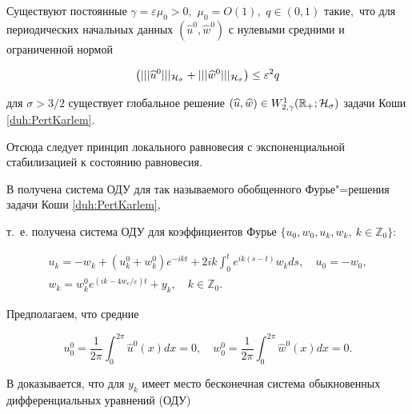 \begin{theorem}[1]\label{duh:0}Существуют постоянные $\gamma=\varepsilon \mu_0>0,$ $\mu_0=O{(1)},$ $q\in(0,1)$ такие$,$ что для периодических начальных данных $(\widehat{u}^0, \widehat{w}^0)$ с нулевыми средними и ограниченной нормой

\begin{equation}

\bigl(|||\widehat{u}^0|||_{{\cal H}_\sigma}+|||\widehat{w}^0|||_{{\cal H}_\sigma}\bigr)\le \varepsilon^2 q

\label{duh:estTheo}

\end{equation}

для $\sigma> 3/2$ существует глобальное решение $(\widehat{u},\widehat{w})\in 

W^1_{2,\gamma}(\mathbb R_{+};{\cal H}_\sigma)$ задачи Коши \eqref{duh:PertKarlem}$.$ 

\end{theorem}



\smallskip



Отсюда следует принцип локального равновесия с экспоненциальной стабилизацией к состоянию равновесия.

В \cite{duh:RVD1} получена система ОДУ для так называемого обобщенного  Фурье"=решения задачи Коши \eqref{duh:PertKarlem}, 

т.~е. получена система ОДУ для коэффициентов Фурье $\{u_0, w_0, u_k, w_k,~k\in \mathbb Z_0\}$:

\begin{gather}

u_k=-w_k+(u_k^0+w^0_k)e^{-ikt}+2ik\int_0^t e^{ik(s-t)}w_kds, \quad

u_0=-w_0,

\\

w_k=w^0_k e^{(ik-4w_e /\varepsilon)t}+y_k,\quad k\in \mathbb Z_0.

\label{duh:k}

\end{gather}

Предполагаем, что средние

$$

u_0^0=\frac{1}{2\pi}\int_0^{2\pi} \widehat{u}^0(x) dx= 0, \quad  w_0^0=\frac{1}{2\pi}\int_0^{2\pi} \widehat{w}^0(x) dx=0.

$$

В \cite{duh:RVD1} доказывается, что для $y_k$ имеет место бесконечная система обыкновенных дифференциальных уравнений (ОДУ)

